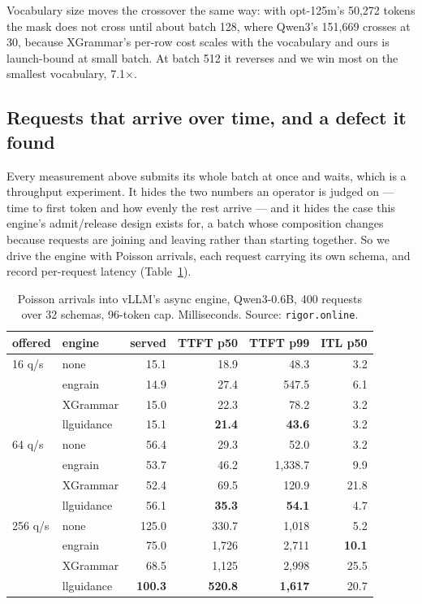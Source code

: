 \documentclass{article}
\begin{document}
Vocabulary size moves the crossover the same way: with opt-125m's 50{,}272
tokens the mask does not cross until about batch 128, where Qwen3's 151{,}669
crosses at 30, because XGrammar's per-row cost scales with the vocabulary and
ours is launch-bound at small batch. At batch 512 it reverses and we win most
on the smallest vocabulary, 7.1$\times$.

\subsection{Requests that arrive over time, and a defect it found}
\label{sec:eval-online}

Every measurement above submits its whole batch at once and waits, which is a
throughput experiment. It hides the two numbers an operator is judged on ---
time to first token and how evenly the rest arrive --- and it hides the case
this engine's admit/release design exists for, a batch whose composition
changes because requests are joining and leaving rather than starting together.
So we drive the engine with Poisson arrivals, each request carrying its own
schema, and record per-request latency (Table~\ref{tab:online}).

\begin{table}[t]
\caption{Poisson arrivals into vLLM's async engine, Qwen3-0.6B, 400 requests
over 32 schemas, 96-token cap. Milliseconds. Source: \texttt{rigor.online}.}
\label{tab:online}
\vskip 0.1in
\begin{center}
\begin{small}
\begin{tabular}{llrrrr}
\toprule
offered & engine & served & TTFT p50 & TTFT p99 & ITL p50 \\
\midrule
16 q/s & none & 15.1 & 18.9 & 48.3 & 3.2 \\
 & engrain & 14.9 & 27.4 & 547.5 & 6.1 \\
 & XGrammar & 15.0 & 22.3 & 78.2 & 3.2 \\
 & llguidance & 15.1 & \textbf{21.4} & \textbf{43.6} & 3.2 \\
\midrule
64 q/s & none & 56.4 & 29.3 & 52.0 & 3.2 \\
 & engrain & 53.7 & 46.2 & 1{,}338.7 & 9.9 \\
 & XGrammar & 52.4 & 69.5 & 120.9 & 21.8 \\
 & llguidance & 56.1 & \textbf{35.3} & \textbf{54.1} & 4.7 \\
\midrule
256 q/s & none & 125.0 & 330.7 & 1{,}018 & 5.2 \\
 & engrain & 75.0 & 1{,}726 & 2{,}711 & \textbf{10.1} \\
 & XGrammar & 68.5 & 1{,}125 & 2{,}998 & 25.5 \\
 & llguidance & \textbf{100.3} & \textbf{520.8} & \textbf{1{,}617} & 20.7 \\
\bottomrule
\end{tabular}
\end{small}
\end{center}
\vskip -0.1in
\end{table}
\end{document}
